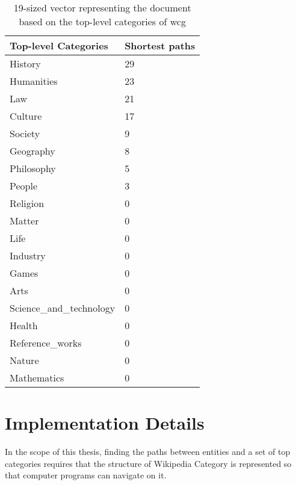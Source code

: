 \begin{table}[H]
\centering
\caption{19-sized vector representing the document based on the top-level categories of \gls{wcg}}
\label{tab:vector}
\begin{tabular}{@{}ll@{}}
\toprule
Top-level Categories     & Shortest paths \\ \midrule
History                  & 29             \\
Humanities               & 23             \\
Law                      & 21             \\
Culture                  & 17             \\
Society                  & 9              \\
Geography                & 8              \\
Philosophy               & 5              \\
People                   & 3              \\
Religion                 & 0              \\
Matter                   & 0              \\
Life                     & 0              \\
Industry                 & 0              \\
Games                    & 0              \\
Arts                     & 0              \\
Science\_and\_technology & 0              \\
Health                   & 0              \\
Reference\_works         & 0              \\
Nature                   & 0              \\
Mathematics              & 0              \\ \bottomrule
\end{tabular}
\end{table}






\section{\hspace*{3pt}Implementation Details}
In the scope of this thesis, finding the paths between entities and a set of top categories requires that the structure of Wikipedia Category is represented so that computer programs can navigate on it. 

